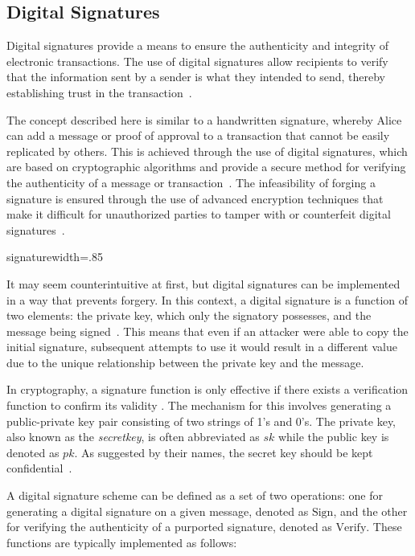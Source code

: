 \subsection{Digital Signatures}
Digital signatures provide a means to ensure the authenticity and integrity of electronic transactions. The use of digital
signatures allow recipients to verify that the information sent by a sender is what they intended to send, thereby establishing
trust in the transaction~\cite{stinson2018cryptography}.

The concept described here is similar to a handwritten signature, whereby Alice can add a message or proof of approval to
a transaction that cannot be easily replicated by others. This is achieved through the use of digital signatures, which
are based on cryptographic algorithms and provide a secure method for verifying the authenticity of a message or
transaction~\cite{elgamal1985public}. The infeasibility of forging a signature is ensured through the use of advanced
encryption techniques that make it difficult for unauthorized parties to tamper with or counterfeit digital
signatures~\cite{elgamal1985public}.

{signature}{width=.85\textwidth}%

It may seem counterintuitive at first, but digital signatures can be implemented in a way that prevents forgery. In this
context, a digital signature is a function of two elements: the private key, which only the signatory possesses, and the
message being signed~\cite{diffie2022new}. This means that even if an attacker were able to copy the initial signature,
subsequent attempts to use it would result in a different value due to the unique relationship between the private key
and the message.

In cryptography, a signature function is only effective if there exists a verification function to confirm its validity
\cite{stallings2006cryptography}. The mechanism for this involves generating a public-private key pair consisting of two
strings of 1's and 0's. The private key, also known as the \textit{secretkey}, is often abbreviated as $sk$ while the public
key is denoted as $pk$. As suggested by their names, the secret key should be kept confidential~\cite{dss}.

A digital signature scheme can be defined as a set of two operations: one for generating a digital signature on a given
message, denoted as $\text{Sign}$, and the other for verifying the authenticity of a purported signature, denoted as
$\text{Verify}$. These functions are typically implemented as follows:

